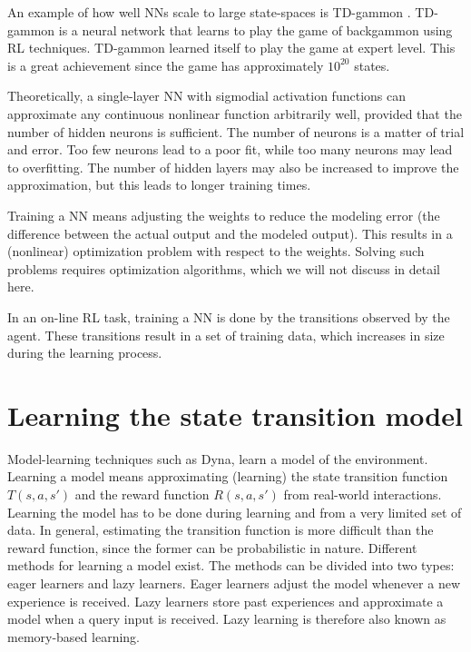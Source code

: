 \documentclass[a4paper,11pt]{mscLiterature}
\begin{document}
 An example of how well NNs scale to large state-spaces is TD-gammon \cite{Tesauro:95}. TD-gammon is a neural network that learns to play the game of backgammon using RL techniques. TD-gammon learned itself to play the game at expert level. This is a great achievement since the game has approximately $10^{20}$ states.

Theoretically, a single-layer NN with sigmodial activation functions can approximate any continuous nonlinear function arbitrarily well, provided that the number of hidden neurons is sufficient. The number of neurons is a matter of trial and error. Too few neurons lead to a poor fit, while too many neurons may lead to overfitting. The number of hidden layers may also be increased to improve the approximation, but this leads to longer training times.

Training a NN means adjusting the weights to reduce the modeling error (the difference between the actual output and the modeled output). This results in a (nonlinear) optimization problem with respect to the weights. Solving such problems requires optimization algorithms, which we will not discuss in detail here.

In an on-line RL task, training a NN is done by the transitions observed by the agent. These transitions result in a set of training data, which increases in size during the learning process. 

\section{Learning the state transition model}
%	

Model-learning techniques such as Dyna, learn a model of the environment. Learning a model means approximating (learning) the state transition function $T(s,a,s')$ and the reward function $R(s,a,s')$ from real-world interactions. Learning the model has to be done during learning and from a very limited set of data. In general, estimating the transition function is more difficult than the reward function, since the former can be probabilistic in nature. Different methods for learning a model exist. The methods can be divided into two types: eager learners and lazy learners. Eager learners adjust the model whenever a new experience is received. Lazy learners store past experiences and approximate a model when a query input is received. Lazy learning is therefore also known as memory-based learning.
\end{document}
